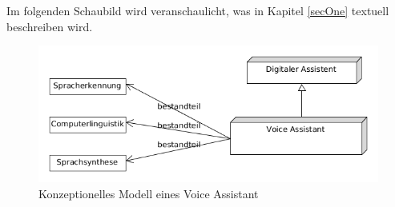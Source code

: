 Im folgenden Schaubild wird veranschaulicht, was in Kapitel \ref{secOne} textuell beschreiben wird.
\begin{figure}[htb]
	\centering
	\includegraphics[scale=0.36]{content/img/bestandteile.png}
	\caption{Konzeptionelles Modell eines Voice Assistant}
	\label{imgBestandteile}
\end{figure}